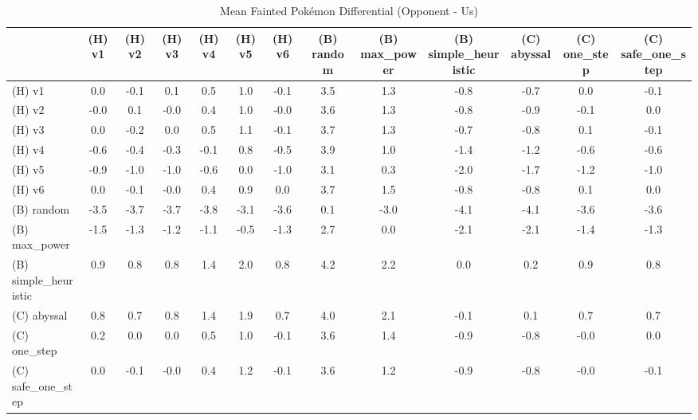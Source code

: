 \begin{table}[htbp]
\caption{Mean Fainted Pokémon Differential (Opponent - Us)}
\label{tab:fainted_diff}
\begin{tabular}{lcccccccccccc}
\hline
 & (H) v1 & (H) v2 & (H) v3 & (H) v4 & (H) v5 & (H) v6 & (B) random & (B) max\_power & (B) simple\_heuristic & (C) abyssal & (C) one\_step & (C) safe\_one\_step \\
\hline
(H) v1 & 0.0 & -0.1 & 0.1 & 0.5 & 1.0 & -0.1 & 3.5 & 1.3 & -0.8 & -0.7 & 0.0 & -0.1 \\
(H) v2 & -0.0 & 0.1 & -0.0 & 0.4 & 1.0 & -0.0 & 3.6 & 1.3 & -0.8 & -0.9 & -0.1 & 0.0 \\
(H) v3 & 0.0 & -0.2 & 0.0 & 0.5 & 1.1 & -0.1 & 3.7 & 1.3 & -0.7 & -0.8 & 0.1 & -0.1 \\
(H) v4 & -0.6 & -0.4 & -0.3 & -0.1 & 0.8 & -0.5 & 3.9 & 1.0 & -1.4 & -1.2 & -0.6 & -0.6 \\
(H) v5 & -0.9 & -1.0 & -1.0 & -0.6 & 0.0 & -1.0 & 3.1 & 0.3 & -2.0 & -1.7 & -1.2 & -1.0 \\
(H) v6 & 0.0 & -0.1 & -0.0 & 0.4 & 0.9 & 0.0 & 3.7 & 1.5 & -0.8 & -0.8 & 0.1 & 0.0 \\
(B) random & -3.5 & -3.7 & -3.7 & -3.8 & -3.1 & -3.6 & 0.1 & -3.0 & -4.1 & -4.1 & -3.6 & -3.6 \\
(B) max\_power & -1.5 & -1.3 & -1.2 & -1.1 & -0.5 & -1.3 & 2.7 & 0.0 & -2.1 & -2.1 & -1.4 & -1.3 \\
(B) simple\_heuristic & 0.9 & 0.8 & 0.8 & 1.4 & 2.0 & 0.8 & 4.2 & 2.2 & 0.0 & 0.2 & 0.9 & 0.8 \\
(C) abyssal & 0.8 & 0.7 & 0.8 & 1.4 & 1.9 & 0.7 & 4.0 & 2.1 & -0.1 & 0.1 & 0.7 & 0.7 \\
(C) one\_step & 0.2 & 0.0 & 0.0 & 0.5 & 1.0 & -0.1 & 3.6 & 1.4 & -0.9 & -0.8 & -0.0 & 0.0 \\
(C) safe\_one\_step & 0.0 & -0.1 & -0.0 & 0.4 & 1.2 & -0.1 & 3.6 & 1.2 & -0.9 & -0.8 & -0.0 & -0.1 \\
\hline
\end{tabular}
\end{table}
